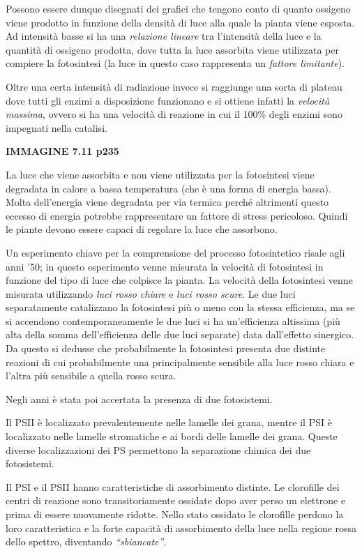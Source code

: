 \documentclass[]{article}
\begin{document}
Possono essere dunque disegnati dei grafici che tengono conto di quanto
ossigeno viene prodotto in funzione della densità di luce alla quale la
pianta viene esposta. Ad intensità basse si ha una \emph{relazione
lineare} tra l'intensità della luce e la quantità di ossigeno prodotta,
dove tutta la luce assorbita viene utilizzata per compiere la
fotosintesi (la luce in questo caso rappresenta un \emph{fattore
limitante}).

Oltre una certa intensità di radiazione invece si raggiunge una sorta di
plateau dove tutti gli enzimi a disposizione funzionano e si ottiene
infatti la \emph{velocità massima}, ovvero si ha una velocità di
reazione in cui il 100\% degli enzimi sono impegnati nella catalisi.

\textbf{IMMAGINE 7.11 p235}

La luce che viene assorbita e non viene utilizzata per la fotosintesi
viene degradata in calore a bassa temperatura (che è una forma di
energia bassa). Molta dell'energia viene degradata per via termica
perché altrimenti questo eccesso di energia potrebbe rappresentare un
fattore di stress pericoloso. Quindi le piante devono essere capaci di
regolare la luce che assorbono.

Un esperimento chiave per la comprensione del processo fotosintetico
risale agli anni '50; in questo esperimento venne misurata la velocità
di fotosintesi in funzione del tipo di luce che colpisce la pianta. La
velocità della fotosintesi venne misurata utilizzando \emph{luci rosso
chiare} e \emph{luci rosso scure}. Le due luci separatamente catalizzano
la fotosintesi più o meno con la stessa efficienza, ma se si accendono
contemporaneamente le due luci si ha un'efficienza altissima (più alta
della somma dell'efficienza delle due luci separate) data dall'effetto
sinergico. Da questo si dedusse che probabilmente la fotosintesi
presenta due distinte reazioni di cui probabilmente una principalmente
sensibile alla luce rosso chiara e l'altra più sensibile a quella rosso
scura.

Negli anni è stata poi accertata la presenza di due fotosistemi.

Il PSII è localizzato prevalentemente nelle lamelle dei grana, mentre il
PSI è localizzato nelle lamelle stromatiche e ai bordi delle lamelle dei
grana. Queste diverse localizzazioni dei PS permettono la separazione
chimica dei due fotosistemi.

Il PSI e il PSII hanno caratteristiche di assorbimento distinte. Le
clorofille dei centri di reazione sono transitoriamente ossidate dopo
aver perso un elettrone e prima di essere nuovamente ridotte. Nello
stato ossidato le clorofille perdono la loro caratteristica e la forte
capacità di assorbimento della luce nella regione rossa dello spettro,
diventando \emph{``sbiancate''}.
\end{document}
